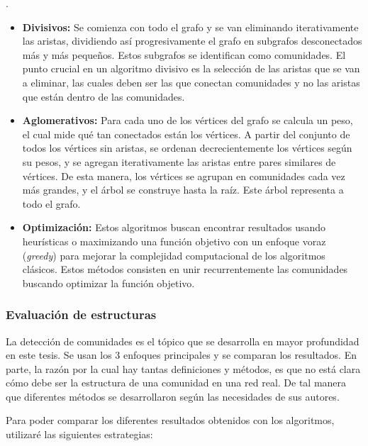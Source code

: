 \begin{itemize}
.
\begin{itemize}
\item \textbf{Divisivos:} Se comienza con todo el grafo y se van eliminando iterativamente las aristas, dividiendo así progresivamente el grafo en subgrafos desconectados más y más pequeños. Estos subgrafos se identifican como comunidades. El punto crucial en un algoritmo divisivo es la selección de las aristas que se van a eliminar, las cuales deben ser las que conectan comunidades y no las aristas que están dentro de las comunidades. \cite{Radicchi2004DefiningNetworks,Girvan2002CommunityNetworks.,Newman2004FastNetworks}
\item \textbf{Aglomerativos:} Para cada uno de los vértices del grafo se calcula un peso, el cual mide qué tan conectados están los vértices. A partir del conjunto de todos los vértices sin aristas, se ordenan decrecientemente los vértices según su pesos, y se agregan iterativamente las aristas entre pares similares de vértices. De esta manera, los vértices se agrupan en comunidades cada vez más grandes, y el árbol se construye hasta la raíz. Este árbol representa a todo el grafo. \cite{Radicchi2004DefiningNetworks,Pons2005ComputingWalks}
\item \textbf{Optimización:} Estos algoritmos buscan encontrar resultados usando heurísticas o maximizando una función objetivo con un enfoque voraz (\textit{greedy}) para mejorar la complejidad computacional de los algoritmos clásicos. Estos métodos consisten en unir recurrentemente las comunidades buscando optimizar la función objetivo.\cite{Clauset2004FindingNetworks,Blondel2008FastNetworks}
\end{itemize}
  
\end{itemize}

\subsubsection{Evaluación de estructuras}
La detección de comunidades es el tópico que se desarrolla en mayor profundidad en este tesis. Se usan los 3 enfoques principales y se comparan los resultados. En parte, la razón por la cual hay tantas definiciones y métodos, es que no está clara cómo debe ser la estructura de una comunidad en una red real. De tal manera que diferentes métodos se desarrollaron según las necesidades de sus autores\cite{Tang2010}.

Para poder comparar los diferentes resultados obtenidos con los algoritmos, utilizaré las siguientes estrategias:

